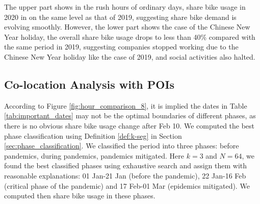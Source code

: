 \documentclass[ijgi,submit,moreauthors,pdftex]{Definitions/mdpi}
\begin{document}
The upper part shows in the rush hours of ordinary days, share bike usage in 2020 in on the same level as that of 2019, suggesting share bike demand is evolving smoothly.
However, the lower part shows the case of the Chinese New Year holiday, the overall share bike usage drops to less than 40\% compared with the same period in 2019, suggesting companies stopped working due to the Chinese New Year holiday like the case of 2019, and social activities also halted. 

\subsection{Co-location Analysis with POIs}\label{sec:colo-poi}

According to Figure \ref{fig:hour_comparison_8}, it is implied the dates in Table \ref{tab:important_dates} may not be the optimal boundaries of different phases, as there is no obvious share bike usage change after Feb 10.
We computed the best phase classification using Definition \ref{def:k-seg} in Section \ref{sec:phase_classification}.
We classified the period into three phases: before pandemics, during pandemics, pandemics mitigated.
Here $k=3$ and $N=64$, we found the best classified phases using exhaustive search and assign them with reasonable explanations: 01 Jan-21 Jan (before the pandemic), 22 Jan-16 Feb (critical phase of the pandemic) and 17 Feb-01 Mar (epidemics mitigated).
We computed then share bike usage in these phases.
\end{document}
